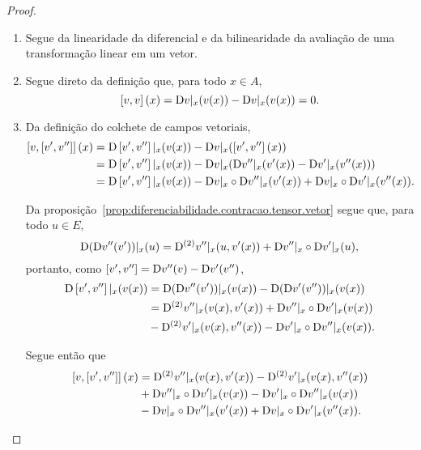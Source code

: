 \begin{proof}
	\begin{enumerate}
	\item Segue da linearidade da diferencial e da bilinearidade da avaliação de uma transformação linear em um vetor.
	
	\item Segue direto da definição que, para todo $x \in A$,
		\begin{equation*}
		\left[{v},{v}\right](x) = \mathrm{D} v|_x (v(x)) - \mathrm{D} v|_x (v(x)) = 0.
		\end{equation*}
	
	\item Da definição do colchete de campos vetoriais,
	\begin{align*}
		\left[{v},{\left[{v'},{v''}\right]}\right](x) &= \mathrm{D} \left[{v'},{v''}\right]|_x(v(x)) - \mathrm{D} v|_x(\left[{v'},{v''}\right](x)) \\
		&= \mathrm{D} \left[{v'},{v''}\right]|_x(v(x)) - \mathrm{D} v|_x(\mathrm{D} v''|_x(v'(x)) - \mathrm{D} v'|_x(v''(x))) \\
		&= \mathrm{D} \left[{v'},{v''}\right]|_x(v(x)) - \mathrm{D} v|_x \circ \mathrm{D} v''|_x(v'(x)) + \mathrm{D} v|_x \circ \mathrm{D} v'|_x(v''(x)).
	\end{align*}
	
	Da proposição~\ref{prop:diferenciabilidade.contracao.tensor.vetor} segue que, para todo $u \in E$,
		\begin{equation*}
		\mathrm{D} (\mathrm{D} v''(v'))|_x(u) = \mathrm{D}^{(2)} v''|_x(u, v'(x)) + \mathrm{D} v''|_x \circ \mathrm{D} v'|_x(u),
		\end{equation*}
	portanto, como $\left[{v'},{v''}\right] = \mathrm{D} v''(v) - \mathrm{D} v'(v'')$,
		\begin{align*}
		\mathrm{D} \left[{v'},{v''}\right]|_x(v(x)) &= \mathrm{D} (\mathrm{D} v''(v'))|_x(v(x)) - \mathrm{D} (\mathrm{D} v'(v''))|_x(v(x)) \\
			&= \mathrm{D}^{(2)} v''|_x(v(x), v'(x)) + \mathrm{D} v''|_x \circ \mathrm{D} v'|_x(v(x)) \\
			&- \mathrm{D}^{(2)} v'|_x(v(x), v''(x)) - \mathrm{D} v'|_x \circ \mathrm{D} v''|_x(v(x)).
		\end{align*}
	
	Segue então que
		\begin{align*}
		\left[{v},{\left[{v'},{v''}\right]}\right](x) &= \mathrm{D}^{(2)} v''|_x (v(x),v'(x)) - \mathrm{D}^{(2)}v'|_x (v(x),v''(x)) \\
				&+ \mathrm{D} v''|_x \circ \mathrm{D} v'|_x (v(x)) - \mathrm{D} v'|_x \circ \mathrm{D} v''|_x (v(x)) \\
				&- \mathrm{D} v|_x \circ \mathrm{D} v''|_x (v'(x)) + \mathrm{D} v|_x \circ \mathrm{D} v'|_x (v''(x)).
		\end{align*}
	

\end{enumerate}
\end{proof}
